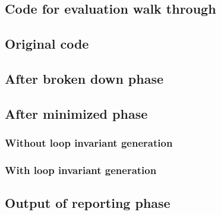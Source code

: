 \begin{appendices}
\section{Code for evaluation walk through}\label{A:eval-walkthrough}

\subsection{Original code}

\subsection{After broken down phase}

\subsection{After minimized phase}

\subsubsection{Without loop invariant generation}

\subsubsection{With loop invariant generation}

\subsection{Output of reporting phase}


\end{appendices}
